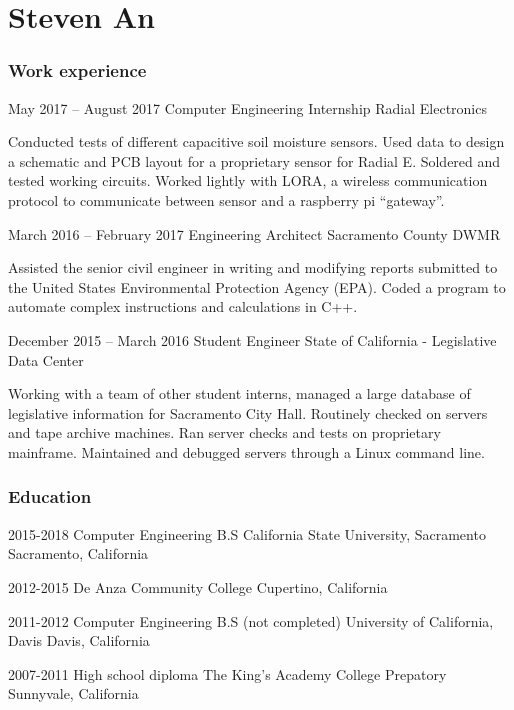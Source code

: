\documentclass{tccv}
\begin{document}
\part{Steven An}

\section{Work experience}

\begin{eventlist}

\item{May 2017 -- August 2017}
     {Computer Engineering Internship}
     {Radial Electronics}

Conducted tests of different capacitive soil moisture sensors. Used
data to design a schematic and PCB layout for a proprietary sensor for
Radial E. Soldered and tested working circuits. Worked lightly with LORA,
a wireless communication protocol to communicate between sensor
and a raspberry pi “gateway”.

\item{March 2016 -- February 2017}
     {Engineering Architect}
     {Sacramento County DWMR}

Assisted the senior civil engineer in writing and modifying reports
submitted to the United States Environmental Protection Agency
(EPA). Coded a program to automate complex instructions and
calculations in C++.

\item{December 2015 -- March 2016}
     {Student Engineer}
     {State of California - Legislative Data Center}

Working with a team of other student interns, managed a large
database of legislative information for Sacramento City Hall. Routinely
checked on servers and tape archive machines. Ran server checks
and tests on proprietary mainframe. Maintained and debugged servers
through a Linux command line.


\end{eventlist}



\section{Education}

\begin{yearlist}

\item[2015-2018 Computer Engineering B.S]{}
     {California State University, Sacramento}
     {Sacramento, California}

\item[2012-2015]{}
      {De Anza Community College}
      {Cupertino, California}


\item[2011-2012 Computer Engineering B.S (not completed)]{}
     {University of California, Davis}
     {Davis, California}

\item[2007-2011 High school diploma]{}
     {The King's Academy College Prepatory}
     {Sunnyvale, California}



\end{yearlist}
\end{document}
